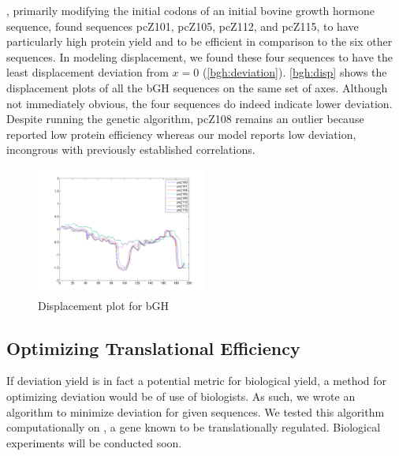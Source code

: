 \documentclass[12pt, draft]{article}
\numberwithin{equation}{section}
\begin{document}


\citet{schoner:bgh}, primarily modifying the initial codons of an
initial bovine growth hormone sequence, found sequences pcZ101,
pcZ105, pcZ112, and pcZ115, to have particularly high protein yield
and to be efficient in comparison to the six other sequences. In
modeling displacement, we found these four sequences  to have the least
displacement deviation from $x = 0$
(\autoref{bgh:deviation}). \autoref{bgh:disp} shows the displacement
plots of all the bGH sequences on the same set of axes. Although not
immediately obvious, the four sequences do indeed indicate lower
deviation. Despite running the genetic algorithm, pcZ108 remains an
outlier because \citeauthor{schoner:bgh} reported low protein
efficiency whereas our model reports low deviation, incongrous with
previously established correlations.

\begin{figure}
  \caption{Displacement plot for bGH}
  \label{bgh:disp}
  \includegraphics[width=0.5\textwidth]{bgh/all}
\end{figure}

\subsection{Optimizing Translational Efficiency}

If deviation yield is in fact a potential metric for biological yield,
a method for optimizing deviation would be of use of biologists.  As such,
we wrote an algorithm to minimize deviation for given sequences.
We tested this algorithm computationally on \rpoS, a gene known to
be translationally regulated.  Biological experiments will be
conducted soon.

\end{document}
